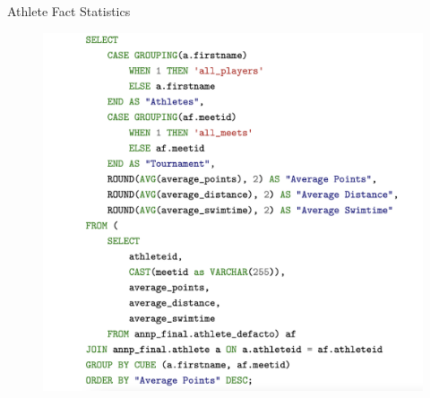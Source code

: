 \documentclass[aspectratio=169, xcolor=dvipsnames]{beamer}
\begin{document}
\begin{frame}{Athlete Fact Statistics}
\begin{figure}
    \includegraphics[scale=0.2]{img/athletes-stats.png}\hspace*{10cm}
\end{figure}
\end{frame}
\end{document}

